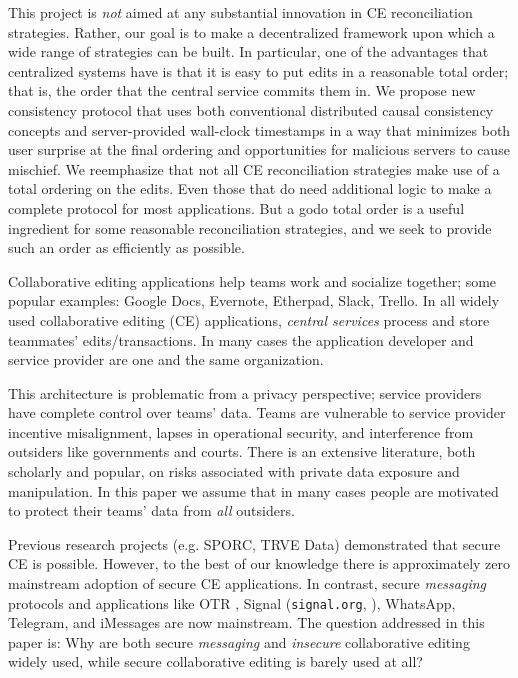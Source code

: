 \documentclass[runningheads]{llncs}
\begin{document}
This project is \emph{not} aimed at any substantial innovation in CE reconciliation strategies.
Rather, our goal is to make a decentralized framework upon which a wide range of strategies can be built.
In particular, one of the advantages that centralized systems have is that it is easy to put edits in a reasonable total order; that is, the order that the central service commits them in.
We propose new consistency protocol that uses both conventional distributed causal consistency concepts and server-provided wall-clock timestamps in a way that minimizes both user surprise at the final ordering and opportunities for malicious servers to cause mischief.
We reemphasize that not all CE reconciliation strategies make use of a total ordering on the edits.
Even those that do need additional logic to make a complete protocol for most applications.
But a godo total order is a useful ingredient for some reasonable reconciliation strategies, and we seek to provide such an order as efficiently as possible.

Collaborative editing applications help teams work and socialize together; some popular examples: Google Docs, Evernote, Etherpad, Slack, Trello.
In all widely used collaborative editing (CE) applications, \emph{central services} process and store teammates' edits{\slash}transactions.
In many cases the application developer and service provider are one and the same organization.

This architecture is problematic from a privacy perspective; service providers have complete control over teams' data.
Teams are vulnerable to service provider incentive misalignment, lapses in operational security, and interference from outsiders like governments and courts.
There is an extensive literature, both scholarly and popular, on risks associated with private data exposure and manipulation.
In this paper we assume that in many cases people are motivated to protect their teams' data from \emph{all} outsiders.

Previous research projects (e.g. SPORC\cite{Feldman2010}, TRVE Data\cite{Kleppmann2018}) demonstrated that secure CE is possible.
However, to the best of our knowledge there is approximately zero mainstream adoption of secure CE applications.
In contrast, secure \emph{messaging} protocols and applications like OTR \cite{Borisov2004}, Signal (\texttt{signal.org}, \cite{Cohn-Gordon2018}), WhatsApp, Telegram, and iMessages are now mainstream.
The question addressed in this paper is: Why are both secure \emph{messaging} and \emph{insecure} collaborative editing widely used, while secure collaborative editing is barely used at all?\footnotemark{}
\end{document}
